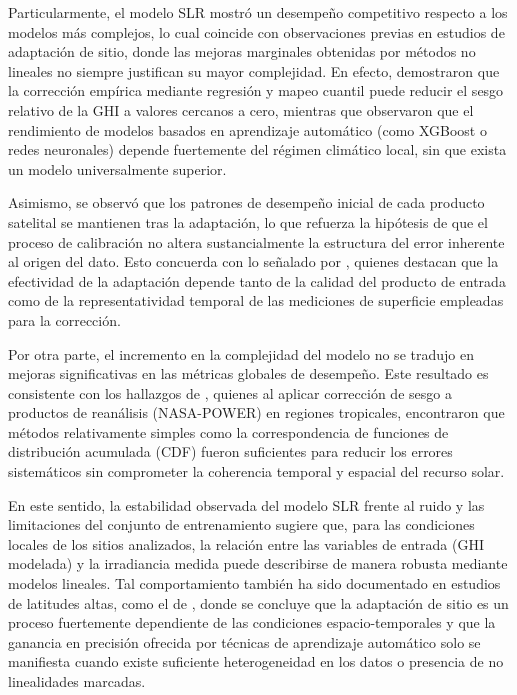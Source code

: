 Particularmente, el modelo SLR mostró un desempeño competitivo respecto a los modelos más complejos, lo cual coincide con observaciones previas en estudios de adaptación de sitio, donde las mejoras marginales obtenidas por métodos no lineales no siempre justifican su mayor complejidad. En efecto, \citep{Fernández2020} demostraron que la corrección empírica mediante regresión y mapeo cuantil puede reducir el sesgo relativo de la GHI a valores cercanos a cero, mientras que \citep{ZAINALI2024} observaron que el rendimiento de modelos basados en aprendizaje automático (como XGBoost o redes neuronales) depende fuertemente del régimen climático local, sin que exista un modelo universalmente superior.

Asimismo, se observó que los patrones de desempeño inicial de cada producto satelital se mantienen tras la adaptación, lo que refuerza la hipótesis de que el proceso de calibración no altera sustancialmente la estructura del error inherente al origen del dato. Esto concuerda con lo señalado por \cite{POLO2020}, quienes destacan que la efectividad de la adaptación depende tanto de la calidad del producto de entrada como de la representatividad temporal de las mediciones de superficie empleadas para la corrección.

Por otra parte, el incremento en la complejidad del modelo no se tradujo en mejoras significativas en las métricas globales de desempeño. Este resultado es consistente con los hallazgos de \citep{Quansah2024}, quienes al aplicar corrección de sesgo a productos de reanálisis (NASA-POWER) en regiones tropicales, encontraron que métodos relativamente simples como la correspondencia de funciones de distribución acumulada (CDF) fueron suficientes para reducir los errores sistemáticos sin comprometer la coherencia temporal y espacial del recurso solar.

En este sentido, la estabilidad observada del modelo SLR frente al ruido y las limitaciones del conjunto de entrenamiento sugiere que, para las condiciones locales de los sitios analizados, la relación entre las variables de entrada (GHI modelada) y la irradiancia medida puede describirse de manera robusta mediante modelos lineales. Tal comportamiento también ha sido documentado en estudios de latitudes altas, como el de \citep{ZAINALI2024}, donde se concluye que la adaptación de sitio es un proceso fuertemente dependiente de las condiciones espacio-temporales y que la ganancia en precisión ofrecida por técnicas de aprendizaje automático solo se manifiesta cuando existe suficiente heterogeneidad en los datos o presencia de no linealidades marcadas.

